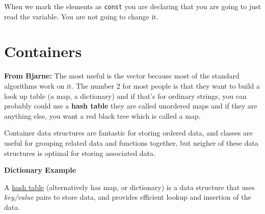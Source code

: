 \documentclass[11pt, a4paper]{article}
\begin{document}
	When we mark the elements as \texttt{const} you are declaring that you are going to just read the variable. You are not going to change it.
	
	



	\section{Containers}%
	\label{sec:containers}
	
	\textbf{From Bjarne:}
	The most useful is the vector because most of the standard algorithms work on it. 
	The number 2 for most people is that they want to build a look up table (a map, a dictionary) and if that's for ordinary strings, you can probably could use a \textbf{hash table}  they are called unordered maps and if they are anything else, you want a red black tree which is called a map.
	
	\vspace{0.1cm}

	Container data structures are fantastic for storing ordered data, and classes are useful for grouping related data and functions together, but neigher of these data structures is optimal for storing associated data. 


	\textbf{Dictionary Example}

	\vspace{0.1cm}

	A  \href{https://en.wikipedia.org/wiki/Hash_table}{hash table} (alternatively has map, or dictionary) is a data structure that uses \textit{key/value} pairs to store data, and provides efficient lookup and insertion of the data.


	
\end{document}
